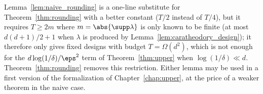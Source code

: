 \begin{remark}
Lemma~\ref{lem:naive_rounding} is a one-line substitute for Theorem~\ref{thm:rounding} with a
better constant ($T/2$ instead of $T/4$), but it requires $T \ge 2m$ where $m = \abs{\supp\lambda}$
is only known to be finite (at most $d(d+1)/2+1$ when $\lambda$ is produced by
Lemma~\ref{lem:caratheodory_design}); it therefore only gives
fixed designs with budget $T = \Omega(d^2)$, which is not enough for the $d\log(1/\delta)/\eps^2$
term of Theorem~\ref{thm:upper} when $\log(1/\delta) \ll d$. Theorem~\ref{thm:rounding} removes
this restriction. Either lemma may be used in a first version of the formalization of
Chapter~\ref{chap:upper}, at the price of a weaker theorem in the naive case.
\end{remark}
